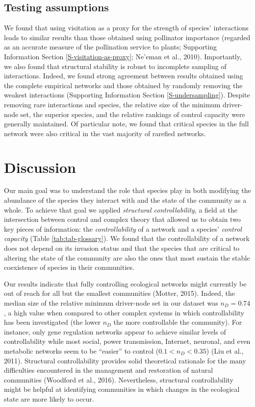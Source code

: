 \documentclass[a4paper]{artikel1}
\theoremstyle{definition}
\theoremstyle{definition}
\theoremstyle{definition}
\theoremstyle{remark}
\begin{document}
\subsection{Testing assumptions}\label{testing-assumptions-1}

We found that using visitation as a proxy for the strength of species'
interactions leads to similar results than those obtained using
pollinator importance (regarded as an accurate measure of the
pollination service to plants; Supporting Information Section
\ref{S-visitation-as-proxy}; Ne'eman et al., 2010). Importantly, we also
found that structural stability is robust to incomplete sampling of
interactions. Indeed, we found strong agreement between results obtained
using the complete empirical networks and those obtained by randomly
removing the weakest interactions (Supporting Information Section
\ref{S-undersampling}). Despite removing rare interactions and species,
the relative size of the minimum driver-node set, the superior species,
and the relative rankings of control capacity were generally maintained.
Of particular note, we found that critical species in the full network
were also critical in the vast majority of rarefied networks.

\section{Discussion}\label{discussion}

Our main goal was to understand the role that species play in both
modifying the abundance of the species they interact with and the state
of the community as a whole. To achieve that goal we applied
\emph{structural controllability}, a field at the intersection between
control and complex theory that allowed us to obtain two key pieces of
information: the \emph{controllability} of a network and a species'
\emph{control capacity} (Table \ref{tab:tab-glossary}). We found that
the controllability of a network does not depend on its invasion status
and that the species that are critical to altering the state of the
community are also the ones that most sustain the stable coexistence of
species in their communities.

Our results indicate that fully controlling ecological networks might
currently be out of reach for all but the smallest communities (Motter,
2015). Indeed, the median size of the relative minimum driver-node set
in our dataset was \(n_D = 0.74\), a high value when compared to other
complex systems in which controllability has been investigated (the
lower \(n_D\) the more controllable the community). For instance, only
gene regulation networks appear to achieve similar levels of
controllability while most social, power transmission, Internet,
neuronal, and even metabolic networks seem to be ``easier'' to control
(\(0.1 < n_D < 0.35\)) (Liu et al., 2011). Structural controllability
provides solid theoretical rationale for the many difficulties
encountered in the management and restoration of natural communities
(Woodford et al., 2016). Nevertheless, structural controllability might
be helpful at identifying communities in which changes in the ecological
state are more likely to occur.
\end{document}
